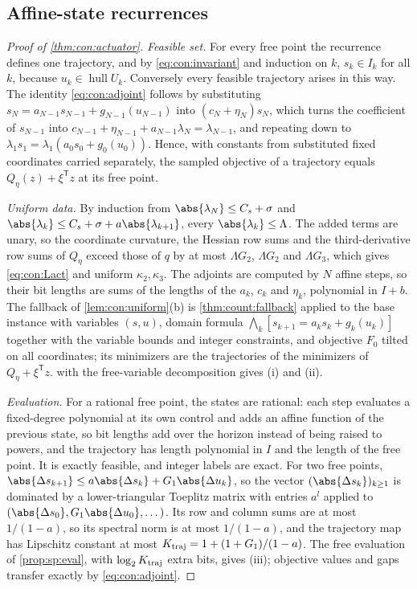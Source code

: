 \subsection{Affine-state recurrences}\label{app:con:actuator}

\begin{proof}[Proof of \cref{thm:con:actuator}]
\emph{Feasible set.} For every free point the recurrence defines one
trajectory, and by \eqref{eq:con:invariant} and induction on $k$,
$s_k\in I_k$ for all $k$, because $u_k\in\operatorname{hull}U_k$. Conversely
every feasible trajectory arises in this way. The identity
\eqref{eq:con:adjoint} follows by substituting $s_N=a_{N-1}s_{N-1}+g_{N-1}(u_{N-1})$
into $(c_N+\eta_N)s_N$, which turns the coefficient of $s_{N-1}$ into
$c_{N-1}+\eta_{N-1}+a_{N-1}\lambda_N=\lambda_{N-1}$, and repeating down to
$\lambda_1s_1=\lambda_1(a_0s_0+g_0(u_0))$. Hence, with constants from
substituted fixed coordinates carried separately, the sampled objective of a
trajectory equals $Q_\eta(z)+\xi^{\mathsf T}z$ at its free point.

\emph{Uniform data.} By induction from $\abs{\lambda_N}\le C_s+\sigma$ and
$\abs{\lambda_k}\le C_s+\sigma+a\abs{\lambda_{k+1}}$, every
$\abs{\lambda_k}\le\Lambda$. The added terms are unary, so the coordinate
curvature, the Hessian row sums and the third-derivative row sums of
$Q_\eta$ exceed those of $q$ by at most $\Lambda G_2$, $\Lambda G_2$ and
$\Lambda G_3$, which gives \eqref{eq:con:Lact} and uniform $\kappa_2,\kappa_3$.
The adjoints are computed by $N$ affine steps, so their bit lengths are sums
of the lengths of the $a_k$, $c_k$ and $\eta_k$, polynomial in $I+b$. The
fallback of \cref{lem:con:uniform}(b) is \cref{thm:count:fallback} applied to
the base instance with variables $(s,u)$, domain formula
$\bigwedge_k[s_{k+1}=a_ks_k+g_k(u_k)]$ together with the variable bounds and
integer constraints, and objective $F_0$ tilted on all coordinates; its
minimizers are the trajectories of the minimizers of $Q_\eta+\xi^{\mathsf
T}z$.  with the free-variable decomposition gives (i)
and (ii).

\emph{Evaluation.} For a rational free point, the states are rational: each
step evaluates a fixed-degree polynomial at its own control and adds an affine
function of the previous state, so bit lengths add over the horizon instead
of being raised to powers, and the trajectory has length polynomial in $I$
and the length of the free point. It is exactly feasible, and integer labels
are exact. For two free points, $\abs{\Delta s_{k+1}}\le a\abs{\Delta
s_k}+G_1\abs{\Delta u_k}$, so the vector $(\abs{\Delta s_k})_{k\ge1}$ is
dominated by a lower-triangular Toeplitz matrix with entries $a^l$ applied to
$(\abs{\Delta s_0},G_1\abs{\Delta u_0},\dots)$. Its row and column sums are at
most $1/(1-a)$, so its spectral norm is at most $1/(1-a)$, and the trajectory
map has Lipschitz constant at most $K_{\rm traj}=1+(1+G_1)/(1-a)$. The free
evaluation of \cref{prop:sp:eval}, with $\log_2K_{\rm traj}$ extra bits,
gives (iii); objective values and gaps transfer exactly by
\eqref{eq:con:adjoint}.
\end{proof}

